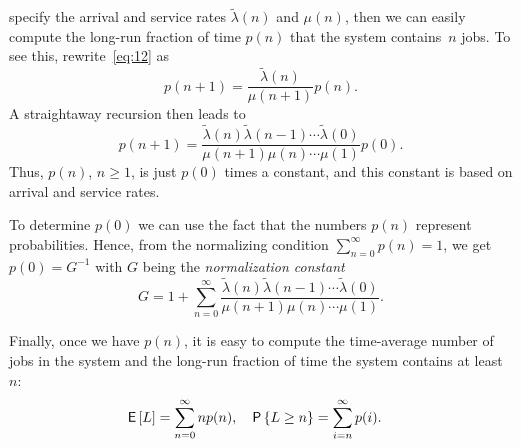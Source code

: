 \documentclass[stochastic-or.tex]{subfiles}
\begin{document}
 specify
the arrival and service rates $\tilde \lambda(n)$ and $\mu(n)$, then we can easily compute the long-run fraction of time $p(n)$ that the system contains~$n$ jobs.
To see this, rewrite~\cref{eq:12} as
\begin{equation}\label{eq:25}
 p(n+1) = \frac{\tilde \lambda(n)}{\mu(n+1)}p(n).
\end{equation}
A straightaway recursion then leads to
\begin{equation*}
 p(n+1) = \frac{\tilde \lambda(n)\tilde\lambda(n-1)\cdots \tilde \lambda(0)}{\mu(n+1)\mu(n)\cdots \mu(1)}p(0).
\end{equation*}
Thus, $p(n)$, $n\geq 1$, is just $p(0)$ times a constant, and this constant is based on  arrival and service rates.

To determine $p(0)$ we can use the fact that the numbers $p(n)$ represent probabilities.
Hence, from the normalizing condition $\sum_{n=0}^\infty p(n)=1$, we get $p(0) = G^{-1}$ with
$G$ being the \emph{normalization constant}
\begin{equation*}
G = 1+\sum_{n=0}^\infty \frac{\tilde \lambda(n)\tilde \lambda(n-1)\cdots\tilde \lambda(0)}{\mu(n+1)\mu(n)\cdots \mu(1)}.
\end{equation*}

Finally, once we have $p(n)$, it is easy to compute  the time-average number of jobs in the system and the long-run fraction of time the system contains at least~$n$:
\begin{align*}
\,\mathsf{E}\left[L\right] &= \sum_{n=0}^\infty n p(n), & \,\mathsf{P}\left\{L \geq n\right\} &= \sum_{i=n}^\infty p(i).
\end{align*}
\end{document}
